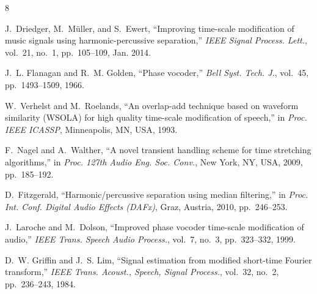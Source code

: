 \documentclass[conference]{IEEEtran}
\begin{document}
\begin{thebibliography}{8}

J.~Driedger, M.~M\"uller, and S.~Ewert, ``Improving time-scale modification of music signals using harmonic-percussive separation,'' \emph{IEEE Signal Process. Lett.}, vol.~21, no.~1, pp.~105--109, Jan. 2014.

J.~L. Flanagan and R.~M. Golden, ``Phase vocoder,'' \emph{Bell Syst. Tech. J.}, vol.~45, pp.~1493--1509, 1966.

W.~Verhelst and M.~Roelands, ``An overlap-add technique based on waveform similarity ({WSOLA}) for high quality time-scale modification of speech,'' in \emph{Proc. IEEE ICASSP}, Minneapolis, MN, USA, 1993.

F.~Nagel and A.~Walther, ``A novel transient handling scheme for time stretching algorithms,'' in \emph{Proc. 127th Audio Eng. Soc. Conv.}, New York, NY, USA, 2009, pp.~185--192.

D.~Fitzgerald, ``Harmonic/percussive separation using median filtering,'' in \emph{Proc. Int. Conf. Digital Audio Effects (DAFx)}, Graz, Austria, 2010, pp.~246--253.

J.~Laroche and M.~Dolson, ``Improved phase vocoder time-scale modification of audio,'' \emph{IEEE Trans. Speech Audio Process.}, vol.~7, no.~3, pp.~323--332, 1999.

D.~W. Griffin and J.~S. Lim, ``Signal estimation from modified short-time Fourier transform,'' \emph{IEEE Trans. Acoust., Speech, Signal Process.}, vol.~32, no.~2, pp.~236--243, 1984.

\end{thebibliography}
\end{document}
